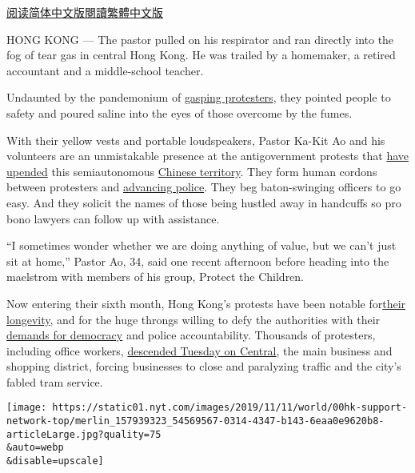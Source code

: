 \href{https://cn.nytimes.com/china/20191112/hong-kong-protests-volunteer/}{阅读简体中文版}\href{https://cn.nytimes.com/china/20191112/hong-kong-protests-volunteer/zh-hant/}{閱讀繁體中文版}

HONG KONG --- The pastor pulled on his respirator and ran directly into
the fog of tear gas in central Hong Kong. He was trailed by a homemaker,
a retired accountant and a middle-school teacher.

Undaunted by the pandemonium of
\href{https://www.nytimes.com/2019/10/27/world/asia/hong-kong-protests-test-china.html}{gasping
protesters}, they pointed people to safety and poured saline into the
eyes of those overcome by the fumes.

With their yellow vests and portable loudspeakers, Pastor Ka-Kit Ao and
his volunteers are an unmistakable presence at the antigovernment
protests that
\href{https://www.nytimes.com/2019/10/31/world/asia/hong-kong-protests.html}{have
upended} this semiautonomous
\href{https://www.nytimes.com/2019/11/06/world/asia/hong-kong-protests-china-national-security.html}{Chinese
territory}. They form human cordons between protesters and
\href{https://www.nytimes.com/2019/10/03/world/asia/hong-kong-protests-police.html}{advancing
police}. They beg baton-swinging officers to go easy. And they solicit
the names of those being hustled away in handcuffs so pro bono lawyers
can follow up with assistance.

``I sometimes wonder whether we are doing anything of value, but we
can't just sit at home,'' Pastor Ao, 34, said one recent afternoon
before heading into the maelstrom with members of his group, Protect the
Children.

Now entering their sixth month, Hong Kong's protests have been notable
for\href{https://www.nytimes.com/interactive/2019/world/asia/hong-kong-protests-arc.html}{their
longevity}, and for the huge throngs willing to defy the authorities
with their
\href{https://www.nytimes.com/2019/11/25/world/asia/hong-kong-election-protests.html}{demands
for democracy} and police accountability. Thousands of protesters,
including office workers,
\href{https://www.nytimes.com/2019/11/11/world/asia/hong-kong-protests-shooting.html}{descended
Tuesday on Central}, the main business and shopping district, forcing
businesses to close and paralyzing traffic and the city's fabled tram
service.

\texttt{[image: https://static01.nyt.com/images/2019/11/11/world/00hk-support-network-top/merlin\_157939323\_54569567-0314-4347-b143-6eaa0e9620b8-articleLarge.jpg?quality=75\\\&auto=webp\\\&disable=upscale]}

